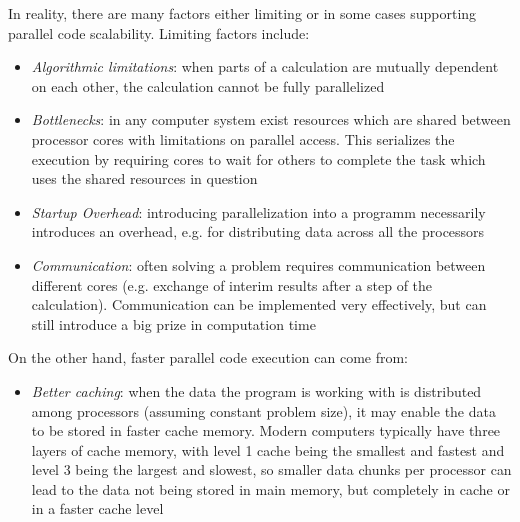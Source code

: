 \documentclass[main.tex]{subfiles}
\begin{document}
In reality, there are many factors either limiting or in some cases supporting parallel code scalability. Limiting factors include:
\begin{itemize}
    \item \emph{Algorithmic limitations}: when parts of a calculation are mutually dependent on each other, the calculation cannot be fully parallelized
    \item \emph{Bottlenecks}: in any computer system exist resources which are shared between processor cores with limitations on parallel access. This serializes the execution by requiring cores to wait for others to complete the task which uses the shared resources in question
    \item \emph{Startup Overhead}: introducing parallelization into a programm necessarily introduces an overhead, e.g. for distributing data across all the processors
    \item \emph{Communication}: often solving a problem requires communication between different cores (e.g. exchange of interim results after a step of the calculation). Communication can be implemented very effectively, but can still introduce a big prize in computation time
\end{itemize}
On the other hand, faster parallel code execution can come from:
\begin{itemize}
    \item \emph{Better caching}: when the data the program is working with is distributed among processors (assuming constant problem size), it may enable the data to be stored in faster cache memory. Modern computers typically have three layers of cache memory, with level 1 cache being the smallest and fastest and level 3 being the largest and slowest, so smaller data chunks per processor can lead to the data not being stored in main memory, but completely in cache or in a faster cache level
\end{itemize}

\section{\QE}\label{sec:qe}
\end{document}

